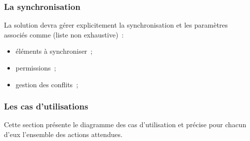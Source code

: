 \subsubsection{La synchronisation}
La solution devra gérer explicitement la synchronisation et les paramètres associés comme (liste non exhaustive)~:
\begin{itemize}
	\item éléments à synchroniser~;
	\item permissions~;
	\item gestion des conflits~;
\end{itemize}

\subsubsection{Les cas d'utilisations}
Cette section présente le diagramme des cas d'utilisation et précise pour chacun d'eux l'ensemble des actions attendues.
